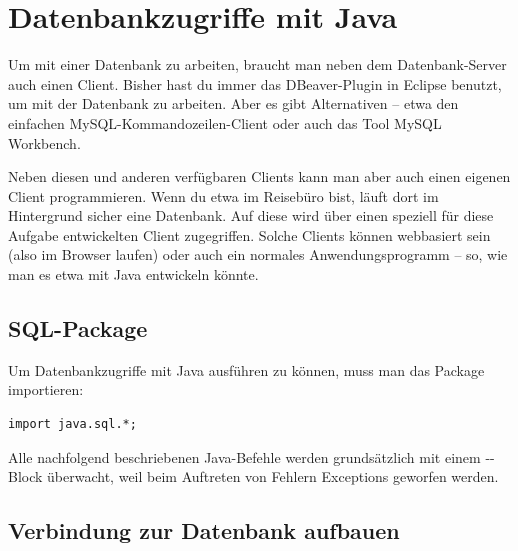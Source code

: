 \chapter{Datenbankzugriffe mit Java}
\renewcommand{\chaptertitle}{Datenbankzugriffe mit Java}

\lehead[]{\normalfont\sffamily\hspace*{-2.00cm}\textcolor{white}{\colorbox{lightblue}{\makebox[1.60cm][r]{\thechapter}}}\hspace{0.17cm}\textcolor{lightblue}{\chaptertitle}}
\rohead[]{\textcolor{lightblue}{\chaptertitle}\normalfont\sffamily\hspace*{0.17cm}\textcolor{white}{\colorbox{lightblue}{\makebox[1.60cm][l]{\thechapter}}}\hspace{-2.00cm}}
\rehead[]{\textcolor{lightblue}{AvHG, Inf, My}}
\lohead[]{\textcolor{lightblue}{AvHG, Inf, My}}

\lstset{style=myJava}

Um mit einer Datenbank zu arbeiten, braucht man neben dem Datenbank-Server auch
einen Client. Bisher hast du immer das DBeaver-Plugin in Eclipse benutzt, um
mit der Datenbank zu arbeiten. Aber es gibt Alternativen -- etwa den einfachen
MySQL-Kommandozeilen-Client oder auch das Tool MySQL Workbench.

Neben diesen und anderen verfügbaren Clients kann man aber auch einen eigenen
Client programmieren. Wenn du etwa im Reisebüro bist, läuft dort im Hintergrund
sicher eine Datenbank. Auf diese wird über einen speziell für diese Aufgabe
entwickelten Client zugegriffen. Solche Clients können webbasiert sein (also
im Browser laufen) oder auch ein normales Anwendungsprogramm -- so, wie man es
etwa mit Java entwickeln könnte.


\section{SQL-Package}

Um Datenbankzugriffe mit Java ausführen zu können, muss man das Package
 importieren:

\begin{lstlisting}
import java.sql.*;
\end{lstlisting}

Alle nachfolgend beschriebenen Java-Befehle werden grundsätzlich mit einem
--Block überwacht, weil beim Auftreten von Fehlern
Exceptions geworfen werden.


\section{Verbindung zur Datenbank aufbauen}

